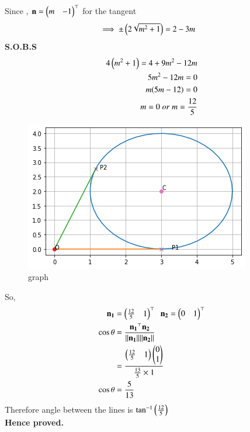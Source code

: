 \documentclass[journal,12pt,twocolumn]{IEEEtran}
\begin{document}
    Since , $ \mathbf{n} = \begin{pmatrix}m & -1\end{pmatrix}^\top \label{eq}$ for the tangent
\begin{align}
   \implies \pm \left(2\sqrt{m^2+1}\right)&=2-3m
\end{align}
\textbf{S.O.B.S}
\begin{align}
    4\left(m^2+1\right)=4 + 9m^2 -12m\\
    5m^2-12m=0\\
    m(5m-12)=0\\
    m=0 \;or\; m = \frac{12}{5}
\end{align}
    \begin{figure}
        \centering
        \includegraphics[width = \columnwidth]{Assignment_3.png}
        \caption{graph}
        \label{fig:my_label}
\end{figure}
So,
\begin{align}
\mathbf{n_1}&= \begin{pmatrix}\frac{12}{5} & 1\end{pmatrix}^{\top} \;\; \mathbf{n_2}=\begin{pmatrix}0 & 1\end{pmatrix}^{\top}\\
   \cos \theta &= \frac{\mathbf{n_1}^{\top}\mathbf{n_2}}{\lVert\mathbf{n_1}\rVert\lVert\mathbf{n_2}\rVert}\\
   &= \frac{\begin{pmatrix}\frac{12}{5} & 1\end{pmatrix}\begin{pmatrix}0 \\ 1\end{pmatrix}}{\frac{13}{5}\times 1}\\
   \cos \theta &= \frac{5}{13}
\end{align}
Therefore angle between the lines is $\tan^{-1}\left(\frac{12}{5}\right)$ \\
\textbf{Hence proved.}
\end{document}
